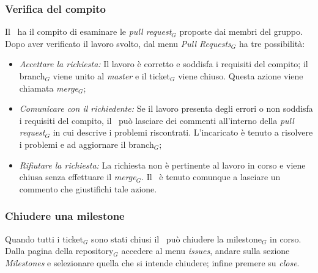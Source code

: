 \subsubsection{Verifica del compito}
Il \ruoloVerificatore\ ha il compito di esaminare le \textit{pull request}$_G$ proposte dai membri del gruppo.\\
Dopo aver verificato il lavoro svolto, dal menu \textit{Pull Requests}$_G$ ha tre possibilità:
\begin{itemize}
\item \textit{Accettare la richiesta:} Il lavoro è corretto e soddisfa i requisiti del compito; il branch$_G$ viene unito al \textit{master} e il ticket$_G$ viene chiuso. Questa azione viene chiamata \textit{merge}$_G$;
\item \textit{Comunicare con il richiedente:} Se il lavoro presenta degli errori o non soddisfa i requisiti del compito, il \ruoloVerificatore\ può lasciare dei commenti all'interno della \textit{pull request}$_G$ in cui descrive i problemi riscontrati. L'incaricato è tenuto a risolvere i problemi e ad aggiornare il branch$_G$;
\item \textit{Rifiutare la richiesta:} La richiesta non è pertinente al lavoro in corso e viene chiusa senza effettuare il \textit{merge}$_G$. Il \ruoloVerificatore\ è tenuto comunque a lasciare un commento che giustifichi tale azione.
\end{itemize}

\subsubsection{Chiudere una milestone}
Quando tutti i ticket$_G$ sono stati chiusi il \ruoloResponsabile\ può chiudere la milestone$_G$ in corso. \\
Dalla pagina della repository$_G$ accedere al menu \textit{issues}, andare sulla sezione \textit{Milestones} e selezionare quella che si intende chiudere; infine premere su \textit{close}.
